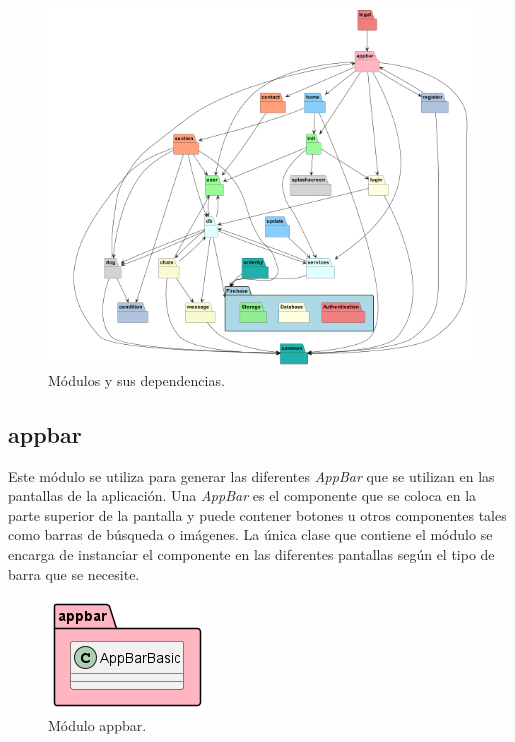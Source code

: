 \documentclass[a4paper, 12pt]{article}
\begin{document}
\begin{figure}[H]
	\begin{center}
		{\includegraphics[width=12cm]{diagram/MODULES.png}\par}
		\caption{Módulos y sus dependencias.}
	\end{center}
\end{figure}


\newpage
\subsection*{appbar}


Este módulo se utiliza para generar las diferentes \textit{AppBar} que se utilizan en las pantallas de la aplicación. Una \textit{AppBar} es el componente que se coloca en la parte superior de la pantalla y puede contener botones u otros componentes tales como barras de búsqueda o imágenes. La única clase que contiene el módulo se encarga de instanciar el componente en las diferentes pantallas según el tipo de barra que se necesite.

\begin{figure}[H]
	\begin{center}
		{\includegraphics[]{diagram/AppBar.png}\par}
		\caption{Módulo appbar.}
	\end{center}
\end{figure}
\end{document}

